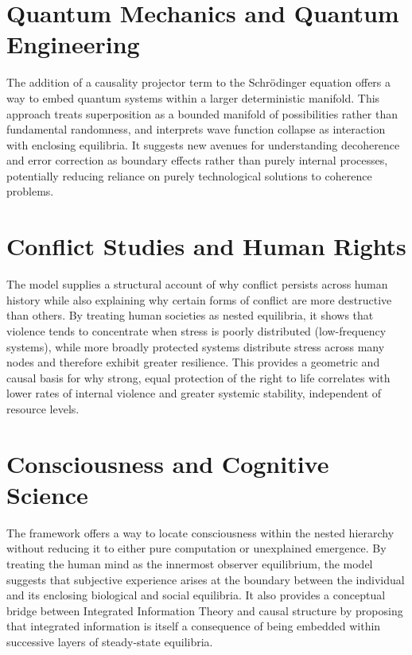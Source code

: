 \section{Quantum Mechanics and Quantum Engineering}

The addition of a causality projector term to the Schrödinger equation offers a way to embed quantum systems within a larger deterministic manifold. This approach treats superposition as a bounded manifold of possibilities rather than fundamental randomness, and interprets wave function collapse as interaction with enclosing equilibria. It suggests new avenues for understanding decoherence and error correction as boundary effects rather than purely internal processes, potentially reducing reliance on purely technological solutions to coherence problems.

\section{Conflict Studies and Human Rights}

The model supplies a structural account of why conflict persists across human history while also explaining why certain forms of conflict are more destructive than others. By treating human societies as nested equilibria, it shows that violence tends to concentrate when stress is poorly distributed (low-frequency systems), while more broadly protected systems distribute stress across many nodes and therefore exhibit greater resilience. This provides a geometric and causal basis for why strong, equal protection of the right to life correlates with lower rates of internal violence and greater systemic stability, independent of resource levels.

\section{Consciousness and Cognitive Science}

The framework offers a way to locate consciousness within the nested hierarchy without reducing it to either pure computation or unexplained emergence. By treating the human mind as the innermost observer equilibrium, the model suggests that subjective experience arises at the boundary between the individual and its enclosing biological and social equilibria. It also provides a conceptual bridge between Integrated Information Theory and causal structure by proposing that integrated information is itself a consequence of being embedded within successive layers of steady-state equilibria.

